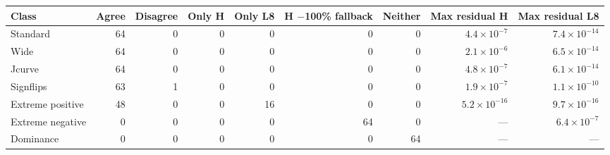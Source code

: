 \begin{tabular}{lrrrrrrrr}
\toprule
Class & Agree & Disagree & Only H & Only L8 & H $-$100\% fallback & Neither & Max residual H & Max residual L8 \\
\midrule
Standard & 64 & 0 & 0 & 0 & 0 & 0 & $4.4\times10^{-7}$ & $7.4\times10^{-14}$ \\
Wide & 64 & 0 & 0 & 0 & 0 & 0 & $2.1\times10^{-6}$ & $6.5\times10^{-14}$ \\
Jcurve & 64 & 0 & 0 & 0 & 0 & 0 & $4.8\times10^{-7}$ & $6.1\times10^{-14}$ \\
Signflips & 63 & 1 & 0 & 0 & 0 & 0 & $1.9\times10^{-7}$ & $1.1\times10^{-10}$ \\
Extreme positive & 48 & 0 & 0 & 16 & 0 & 0 & $5.2\times10^{-16}$ & $9.7\times10^{-16}$ \\
Extreme negative & 0 & 0 & 0 & 0 & 64 & 0 & --- & $6.4\times10^{-7}$ \\
Dominance & 0 & 0 & 0 & 0 & 0 & 64 & --- & --- \\
\bottomrule
\end{tabular}
